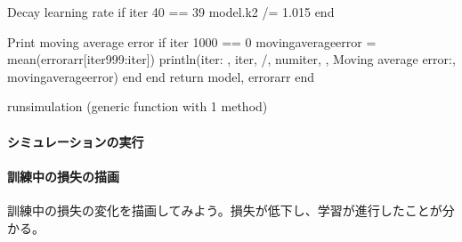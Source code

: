\documentclass[letterpaper,10pt,english]{sphinxmanual}
\begin{document}
\begin{sphinxVerbatim}[commandchars=\\\{\}]
        \PYGZsh{} Decay learning rate         
        if iter \PYGZpc{} 40 == 39
            model.k2 /= 1.015
        end

        \PYGZsh{} Print moving average error
        if iter \PYGZpc{} 1000 == 0
            moving\PYGZus{}average\PYGZus{}error = mean(errorarr[iter\PYGZhy{}999:iter])
            println(\PYGZdq{}iter: \PYGZdq{}, iter, \PYGZdq{}/\PYGZdq{}, num\PYGZus{}iter, \PYGZdq{}, Moving average error:\PYGZdq{}, moving\PYGZus{}average\PYGZus{}error)
        end
    end
    return model, errorarr
end
\end{sphinxVerbatim}

\begin{sphinxVerbatim}[commandchars=\\\{\}]
run\PYGZus{}simulation (generic function with 1 method)
\end{sphinxVerbatim}


\paragraph{シミュレーションの実行}
\label{\detokenize{11-3_predictive-coding-rao:id7}}
\begin{sphinxVerbatim}[commandchars=\\\{\}]
   
   
   

      
\end{sphinxVerbatim}


\paragraph{訓練中の損失の描画}
\label{\detokenize{11-3_predictive-coding-rao:id8}}
訓練中の損失の変化を描画してみよう。損失が低下し、学習が進行したことが分かる。
\end{document}
